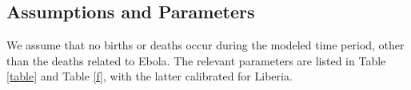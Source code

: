 


\subsection{Assumptions and Parameters}
We assume that no births or deaths occur during the modeled time period, other than the deaths related to Ebola. The relevant parameters are listed in Table \ref{table} and Table \ref{f}, with the latter calibrated for Liberia.

